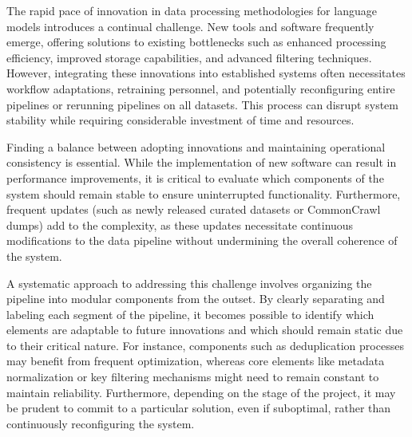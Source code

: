 The rapid pace of innovation in data processing methodologies for language 
models introduces a continual challenge. New tools and software frequently 
emerge, offering solutions to existing bottlenecks such as enhanced processing 
efficiency, improved storage capabilities, and advanced filtering techniques. 
However, integrating these innovations into established systems often necessitates 
workflow adaptations, retraining personnel, and potentially reconfiguring entire 
pipelines or rerunning pipelines on all datasets. This process can disrupt 
system stability while requiring considerable investment of time and resources.

Finding a balance between adopting innovations and maintaining operational 
consistency is essential. While the implementation of new software can result 
in performance improvements, it is critical to evaluate which components of 
the system should remain stable to ensure uninterrupted functionality. 
Furthermore, frequent updates (such as newly released curated datasets or 
CommonCrawl dumps) add to the complexity, as these updates necessitate 
continuous modifications to the data pipeline without undermining the 
overall coherence of the system.

A systematic approach to addressing this challenge involves organizing the 
pipeline into modular components from the outset. By clearly separating and 
labeling each segment of the pipeline, it becomes possible to identify which 
elements are adaptable to future innovations and which should remain static due 
to their critical nature. For instance, components such as deduplication processes
may benefit from frequent optimization, whereas core elements like metadata 
normalization or key filtering mechanisms might need to remain constant to 
maintain reliability. Furthermore, depending on the stage of the project, it 
may be prudent to commit to a particular solution, even if suboptimal, rather 
than continuously reconfiguring the system.


